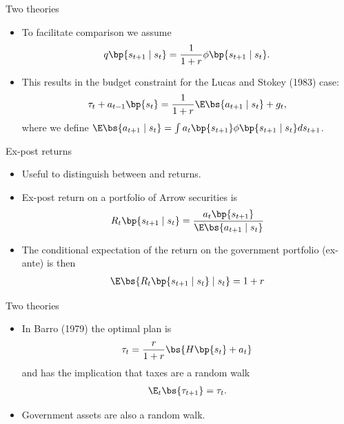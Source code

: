 \documentclass[11pt,xcolor={dvipsnames},hyperref={pdftex,pdfpagemode=UseNone,hidelinks,pdfdisplaydoctitle=true},usepdftitle=false]{beamer}
\begin{document}
    \begin{frame}{Two theories}
    \begin{itemize}
    \item To facilitate comparison we assume 
    \begin{align*}  
    q\bp{s_{t+1} \mid s_t } = \frac{1}{1+r} \phi\bp{s_{t+1} \mid s_t }.
    \end{align*}
    \item This results in the budget constraint for the Lucas and Stokey (1983) case: 
    \begin{align*}
        \tau_t + a_{t-1}\bp{s_t} = \frac{1}{1+r} \E \bs{a_{t+1} \mid s_t} + g_t, 
    \end{align*}
    where we define $\E \bs{a_{t+1} \mid s_t } = \int a_{t}\bp{s_{t+1}} \phi\bp{s_{t+1} \mid s_t } ds_{t+1}$.
    \end{itemize}
    \end{frame}


    \begin{frame}{Ex-post returns}
        \begin{itemize}
        \item Useful to distinguish between  and  returns.
        \item Ex-post return on a portfolio of Arrow securities is 
        \begin{align*}
            R_t \bp{s_{t+1}\mid s_t}=\frac{a_t\bp{s_{t+1}}}{\E \bs{a_{t+1} \mid s_t }}  
        \end{align*}
        \item The conditional expectation of the return on the government portfolio (ex-ante) is then
        \begin{align*}
            \E\bs{R_t \bp{s_{t+1}\mid s_t}\mid s_t} = 1+r
        \end{align*}    
    \end{itemize}
        \end{frame}
    

    \begin{frame}{Two theories}
        \begin{itemize}
        \item In Barro (1979) the optimal plan is 
        \begin{align*}  
        \tau_t = \frac{r}{1+r}\bs{H\bp{s_t}+a_t}
        \end{align*}
        and has the implication that taxes are a random walk
        \begin{align*}  
            \E_{t}\bs{\tau_{t+1}} = \tau_t.
            \end{align*}
            \item Government assets are also a random walk.
        \end{itemize}
        \end{frame}
\end{document}
